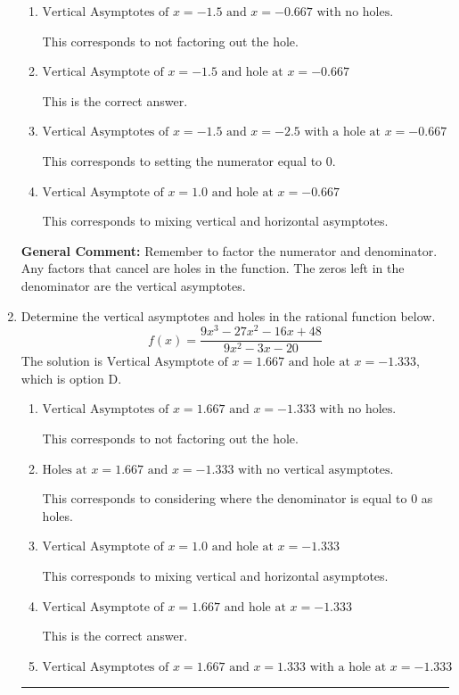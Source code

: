 \documentclass{extbook}[14pt]
\newcommand{\litem}[1]{\item #1

\rule{\textwidth}{0.4pt}}
\begin{document}
\begin{enumerate}
{\begin{enumerate}[label=\Alph*.]
This corresponds to considering where the denominator is equal to 0 as holes.
\item \( \text{Vertical Asymptotes of } x = -1.5 \text{ and } x = -0.667 \text{ with no holes.} \)

This corresponds to not factoring out the hole.
\item \( \text{Vertical Asymptote of } x = -1.5 \text{ and hole at } x = -0.667 \)

This is the correct answer.
\item \( \text{Vertical Asymptotes of } x = -1.5 \text{ and } x = -2.5 \text{ with a hole at } x = -0.667 \)

This corresponds to setting the numerator equal to 0.
\item \( \text{Vertical Asymptote of } x = 1.0 \text{ and hole at } x = -0.667 \)

This corresponds to mixing vertical and horizontal asymptotes.
\end{enumerate}

\textbf{General Comment:} Remember to factor the numerator and denominator. Any factors that cancel are holes in the function. The zeros left in the denominator are the vertical asymptotes.
}
\litem{
Determine the vertical asymptotes and holes in the rational function below.
\[ f(x) = \frac{9x^{3} -27 x^{2} -16 x + 48}{9x^{2} -3 x -20} \]The solution is \( \text{Vertical Asymptote of } x = 1.667 \text{ and hole at } x = -1.333 \), which is option D.\begin{enumerate}[label=\Alph*.]
\item \( \text{Vertical Asymptotes of } x = 1.667 \text{ and } x = -1.333 \text{ with no holes.} \)

This corresponds to not factoring out the hole.
\item \( \text{Holes at } x = 1.667 \text{ and } x = -1.333 \text{ with no vertical asymptotes.} \)

This corresponds to considering where the denominator is equal to 0 as holes.
\item \( \text{Vertical Asymptote of } x = 1.0 \text{ and hole at } x = -1.333 \)

This corresponds to mixing vertical and horizontal asymptotes.
\item \( \text{Vertical Asymptote of } x = 1.667 \text{ and hole at } x = -1.333 \)

This is the correct answer.
\item \( \text{Vertical Asymptotes of } x = 1.667 \text{ and } x = 1.333 \text{ with a hole at } x = -1.333 \)


\end{enumerate}}
\end{enumerate}
\end{document}
